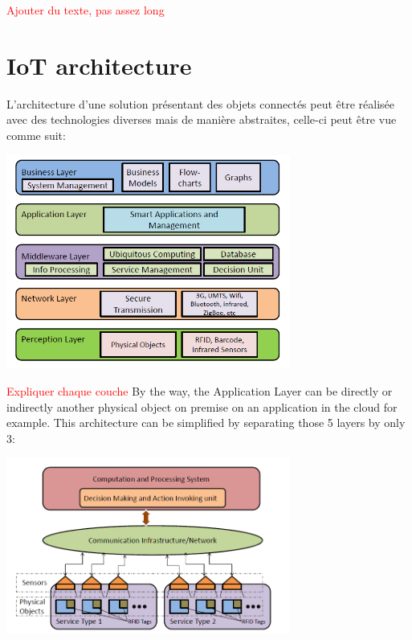 \documentclass[11pt]{article}
\begin{document}
\textcolor{red}{Ajouter du texte, pas assez long}



\section{IoT architecture}

L'architecture d'une solution présentant des objets connectés peut être réalisée avec des technologies diverses mais de manière abstraites, celle-ci peut être vue comme suit: 

\includegraphics[width=0.7\textwidth]{assets/Abstract_IoT_Architecture.PNG}


\textcolor{red}{Expliquer chaque couche}
By the way, the Application Layer can be directly or indirectly another physical object on premise on an application in the cloud for example. This architecture can be simplified by separating those 5 layers by only 3:

\includegraphics[width=0.7\textwidth]{assets/Basic_IOT_Architecture}
\end{document}
